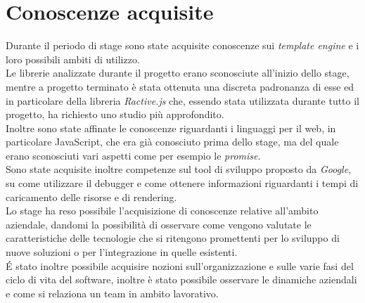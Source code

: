 \section{Conoscenze acquisite}
Durante il periodo di stage sono state acquisite conoscenze sui \textit{template engine} e i loro possibili ambiti di utilizzo.\\
Le librerie analizzate durante il progetto erano sconosciute all'inizio dello stage, mentre a progetto terminato è stata ottenuta una discreta padronanza di esse ed in particolare della libreria \textit{Ractive.js} che, essendo stata utilizzata durante tutto il progetto, ha richiesto uno studio più approfondito.\\
Inoltre sono state affinate le conoscenze riguardanti i linguaggi per il web, in particolare JavaScript, che era già conosciuto prima dello stage, ma del quale erano sconosciuti vari aspetti come per esempio le \textit{promise}.\\
Sono state acquisite inoltre competenze sul tool di sviluppo proposto da \textit{Google}, su come utilizzare il debugger e come ottenere informazioni riguardanti i tempi di caricamento delle risorse e di rendering.\\
Lo stage ha reso possibile l'acquisizione di conoscenze relative all'ambito aziendale, dandomi la possibilità di osservare come vengono valutate le caratteristiche delle tecnologie che si ritengono promettenti per lo sviluppo di nuove soluzioni o per l'integrazione in quelle esistenti.\\
\'E stato inoltre possibile acquisire nozioni sull'organizzazione e sulle varie fasi del ciclo di vita del software, inoltre è stato possibile osservare le dinamiche aziendali e come si relaziona un team in ambito lavorativo.
